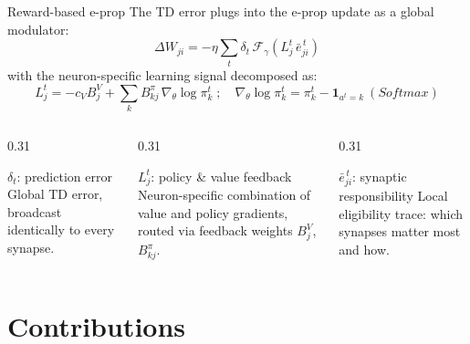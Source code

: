 \documentclass[aspectratio=169,11pt]{beamer}
\begin{document}
\begin{frame}{Reward-based e-prop}
  The TD error plugs into the e-prop update as a global modulator:
  \[
    \Delta W_{ji} = -\eta \sum_t \delta_t\,
      \mathcal{F}_{\gamma}\!\left(L_j^t\, \bar{e}^{\,t}_{ji}\right)
  \]
  with the neuron-specific learning signal decomposed as:
  \[
    L_j^t = -c_V B_j^V + \sum_k B_{kj}^\pi \,
      \nabla_{\theta} \log \pi_k^t
    \;;\quad
    \nabla_{\theta} \log \pi_k^t = \pi_k^t - \mathbf{1}_{a^t=k} \ (Softmax)
  \]
  \begin{columns}[T]
    \begin{column}{0.31\textwidth}
      \begin{block}{$\delta_t$: prediction error}
        Global TD error, broadcast identically to every synapse.
      \end{block}
    \end{column}
    \begin{column}{0.31\textwidth}
      \begin{block}{$L_j^t$: policy \& value feedback}
        Neuron-specific combination of value and policy gradients,
        routed via feedback weights $B^V_j$, $B^\pi_{kj}$.
      \end{block}
    \end{column}
    \begin{column}{0.31\textwidth}
      \begin{block}{$\bar{e}^{\,t}_{ji}$: synaptic responsibility}
        Local eligibility trace: which synapses matter most and how.
      \end{block}
    \end{column}
  \end{columns}
\end{frame}
\section{Contributions}
\end{document}

